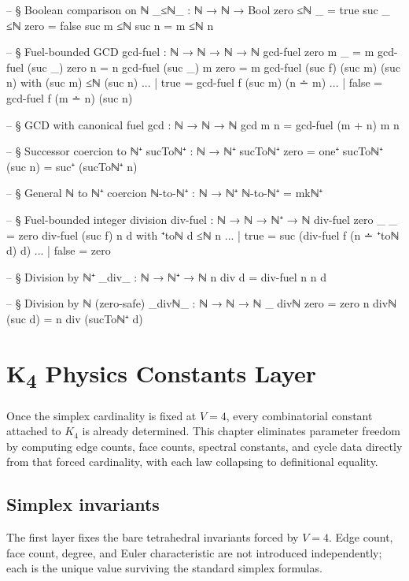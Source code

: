 \documentclass[11pt,a4paper]{book}
\begin{document}
\begin{code}
-- § Boolean comparison on ℕ
_≤ℕ_ : ℕ → ℕ → Bool
zero  ≤ℕ _     = true
suc _ ≤ℕ zero  = false
suc m ≤ℕ suc n = m ≤ℕ n

-- § Fuel-bounded GCD
gcd-fuel : ℕ → ℕ → ℕ → ℕ
gcd-fuel zero    m _       = m
gcd-fuel (suc _) zero n    = n
gcd-fuel (suc _) m zero    = m
gcd-fuel (suc f) (suc m) (suc n) with (suc m) ≤ℕ (suc n)
... | true  = gcd-fuel f (suc m) (n ∸ m)
... | false = gcd-fuel f (m ∸ n) (suc n)

-- § GCD with canonical fuel
gcd : ℕ → ℕ → ℕ
gcd m n = gcd-fuel (m + n) m n

-- § Successor coercion to ℕ⁺
sucToℕ⁺ : ℕ → ℕ⁺
sucToℕ⁺ zero = one⁺
sucToℕ⁺ (suc n) = suc⁺ (sucToℕ⁺ n)

-- § General ℕ to ℕ⁺ coercion
ℕ-to-ℕ⁺ : ℕ → ℕ⁺
ℕ-to-ℕ⁺ = mkℕ⁺

-- § Fuel-bounded integer division
div-fuel : ℕ → ℕ → ℕ⁺ → ℕ
div-fuel zero    _       _ = zero
div-fuel (suc f) n d with ⁺toℕ d ≤ℕ n
... | true  = suc (div-fuel f (n ∸ ⁺toℕ d) d)
... | false = zero

-- § Division by ℕ⁺
_div_ : ℕ → ℕ⁺ → ℕ
n div d = div-fuel n n d

-- § Division by ℕ (zero-safe)
_divℕ_ : ℕ → ℕ → ℕ
_ divℕ zero = zero
n divℕ (suc d) = n div (sucToℕ⁺ d)
\end{code}


\chapter{K\textsubscript{4} Physics Constants Layer}

Once the simplex cardinality is fixed at $V = 4$, every combinatorial constant attached to $K_4$ is already determined. This chapter eliminates parameter freedom by computing edge counts, face counts, spectral constants, and cycle data directly from that forced cardinality, with each law collapsing to definitional equality.

\section{Simplex invariants}

The first layer fixes the bare tetrahedral invariants forced by $V = 4$. Edge count, face count, degree, and Euler characteristic are not introduced independently; each is the unique value surviving the standard simplex formulas.
\end{document}
